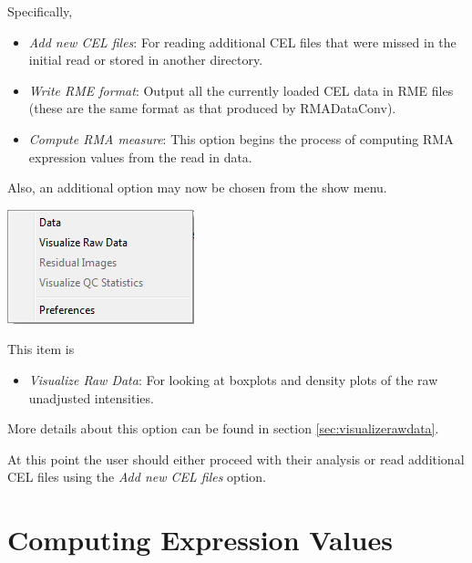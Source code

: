 \documentclass[11pt]{report}
\begin{document}
Specifically,
\begin{itemize}
\item {\it Add new CEL files}: For reading additional CEL files that were missed in the initial read or stored in another directory.
\item {\it Write RME format}: Output all the currently loaded CEL data in RME files (these are the same format as that produced by RMADataConv).  
\item {\it Compute RMA measure}: This option begins the process of computing RMA expression values from the read in data.
\end{itemize}
 
Also, an additional option may now be chosen from the show menu.
\begin{center}
\includegraphics[scale=0.5]{showmenu1}
\end{center}

This item is 
\begin{itemize}
\item {\it Visualize Raw Data}: For looking at boxplots and density plots of the raw unadjusted intensities. 
\end{itemize}
More details about this option can be found in section \ref{sec:visualizerawdata}.

At this point the user should either proceed with their analysis or read additional CEL files using the {\it Add new CEL files} option.


\section{Computing Expression Values}
\end{document}
